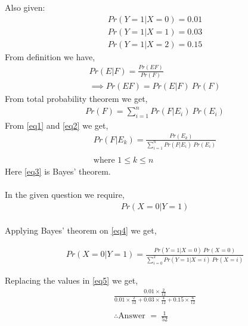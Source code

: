 \documentclass[journal,12pt,twocolumn]{IEEEtran}
\begin{document}
Also given: \\
\begin{align}
    Pr(Y=1|X=0) = 0.01 \\
    Pr(Y=1|X=1) = 0.03 \\
    Pr(Y=1|X=2) = 0.15
\end{align}
From definition we have,
\begin{align}
    Pr(E|F) = \frac{Pr(EF)}{Pr(F)}\\
    \implies Pr(EF) = Pr(E|F)\: Pr(F) \label{eq1}
\end{align}
From total probability theorem we get,
\begin{align}
    Pr(F) = \sum_{i=1}^n Pr(F|E_{i})\: Pr(E_{i}) \label{eq2}
\end{align}
From \ref{eq1} and \ref{eq2} we get,
\begin{align}
    Pr(F|E_{k}) = \frac{Pr(E_{k})}{\sum_{i=1}^n Pr(F|E_{i})\: Pr(E_{i})} \label{eq3}\\
    \nonumber\\
    \text{where }  1\leq k\leq n \nonumber
\end{align}
Here \ref{eq3} is Bayes' theorem.\\ \\
In the given question we require,
\begin{align}
    Pr(X=0|Y=1) \label{eq4}
\end{align}
\\Applying Bayes' theorem on \ref{eq4} we get,

\begin{align}
    Pr(X=0|Y=1) = \frac{Pr(Y=1|X=0)\: Pr(X=0)}{\sum_{i=0}^2 Pr(Y=1|X=i)\: Pr(X=i)}\label{eq5}
\end{align}

Replacing the values in \ref{eq5} we get,
\begin{align}
    \frac{0.01\times\frac{2}{12}}{0.01\times \frac{2}{12}+0.03\times \frac{4}{12}+0.15\times \frac{6}{12}}\\
    \nonumber\\
    \therefore \text{Answer }= \:\frac{1}{52}
\end{align}
\end{document}
